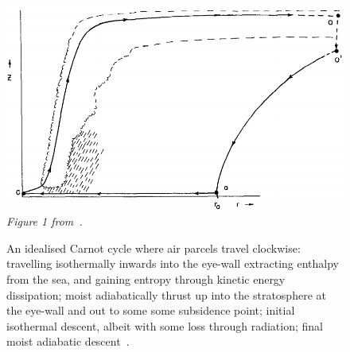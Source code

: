 \begin{figure}
\centering
    \includegraphics[width=\linewidth]{images/hurricane-carnot.png}\\
    \textit{Figure 1 from~\cite{emanuel1991theory}. }
    \caption{An idealised Carnot cycle where air parcels travel clockwise:
            travelling isothermally inwards into the eye-wall extracting enthalpy
            from the sea, and gaining entropy through kinetic energy dissipation;
            moist adiabatically thrust up into the stratosphere
            at the eye-wall and out to some some subsidence point;
            initial isothermal descent, albeit with some loss through radiation;
            final moist adiabatic descent~\cite{emanuel2018progress}. }
            \label{fig:hurricane-carnot}

\end{figure}
